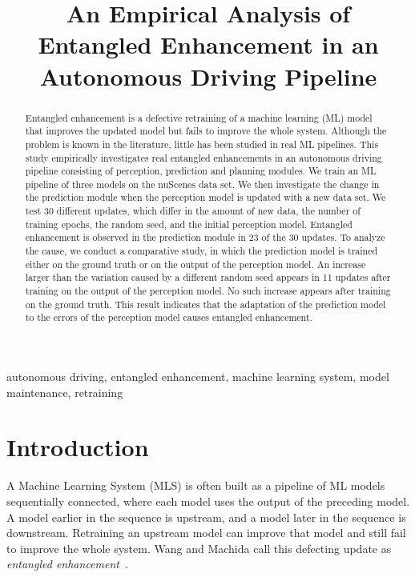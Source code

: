 \documentclass[conference]{IEEEtran}
\title{An Empirical Analysis of Entangled Enhancement in an Autonomous Driving Pipeline}
\begin{document}
\maketitle
\thispagestyle{empty}

\begin{abstract}
Entangled enhancement is a defective retraining of a machine learning (ML) model that improves the updated model but fails to improve the whole system. Although the problem is known in the literature, little has been studied in real ML pipelines. This study empirically investigates real entangled enhancements in an autonomous driving pipeline consisting of perception, prediction and planning modules. We train an ML pipeline of three models on the nuScenes data set. We then investigate the change in the prediction module when the perception model is updated with a new data set. We test 30 different updates, which differ in the amount of new data, the number of training epochs, the random seed, and the initial perception model. Entangled enhancement is observed in the prediction module in 23 of the 30 updates. To analyze the cause, we conduct a comparative study, in which the prediction model is trained either on the ground truth or on the output of the perception model. An increase larger than the variation caused by a different random seed appears in 11 updates after training on the output of the perception model. No such increase appears after training on the ground truth. This result indicates that the adaptation of the prediction model to the errors of the perception model causes entangled enhancement.
\end{abstract}

\begin{IEEEkeywords}
autonomous driving, entangled enhancement, machine learning system, model maintenance, retraining
\end{IEEEkeywords}

\section{Introduction}

A Machine Learning System (MLS) is often built as a pipeline of ML models sequentially connected, where each model uses the output of the preceding model. A model earlier in the sequence is upstream, and a model later in the sequence is downstream. Retraining an upstream model can improve that model and still fail to improve the whole system. Wang and Machida call this defecting update as \emph{entangled enhancement}~\cite{wang2024compsac,wang2025issre}.
\end{document}
